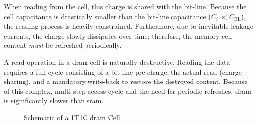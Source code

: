 When reading from the cell, this charge is shared with the bit-line. Because the cell capacitance is drastically smaller than the bit-line capacitance (\(C_i \ll C_{\text{BL}}\)), the reading process is heavily constrained. Furthermore, due to inevitable leakage currents, the charge slowly dissipates over time; therefore, the memory cell content \textit{must} be refreshed periodically. 

A read operation in a \gls{dram} cell is naturally destructive. Reading the data requires a full cycle consisting of a bit-line pre-charge, the actual read (charge sharing), and a mandatory write-back to restore the destroyed content. Because of this complex, multi-step access cycle and the need for periodic refreshes, \gls{dram} is significantly slower than \gls{sram}.

\begin{figure}[htbp]
    \centering
    \caption{Schematic of a 1T1C \gls{dram} Cell}
    \label{fig:dram-cell}
\end{figure}

